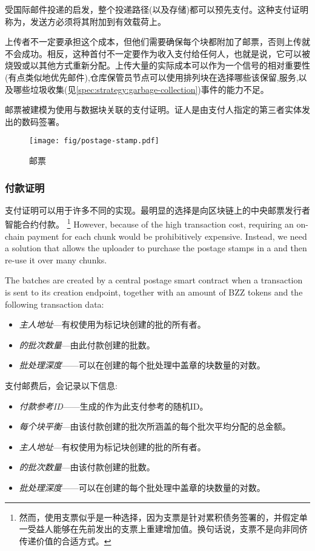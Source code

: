受国际邮件投递的启发，整个投递路径(以及存储)都可以预先支付。这种支付证明称为，发送方必须将其附加到有效载荷上。

上传者不一定要承担这个成本，但他们需要确保每个块都附加了邮票，否则上传就不会成功。相反，这种首付不一定要作为收入支付给任何人，也就是说，它可以被烧毁或以其他方式重新分配。上传大量的实际成本可以作为一个信号的相对重要性(有点类似地优先邮件),仓库保管员节点可以使用排列块在选择哪些该保留,服务,以及哪些垃圾收集(见\ref{spec:strategy:garbage-collection})事件的能力不足。

邮票被建模为使用与数据块关联的支付证明。证人是由支付人指定的第三者实体发出的数码签署。


\begin{figure}[htbp]
\centering
  \texttt{[image: fig/postage-stamp.pdf]}
\caption[邮票\statusgreen]{邮票}
\label{fig:postage-stamps}
\end{figure}

\subsubsection{付款证明}

支付证明可以用于许多不同的实现。最明显的选择是向区块链上的中央邮票发行者智能合约付款。%
%
\footnote{然而，使用支票似乎是一种选择，因为支票是针对累积债务签署的，并假定单一受益人能够在先前发出的支票上重建增加值。换句话说，支票不是向非同侪传递价值的合适方式。}
%
However, because of the high transaction cost, requiring an on-chain payment for each chunk would be prohibitively expensive. Instead, we need a solution that allows the uploader to purchase the postage stamps in a  and then re-use it over many chunks. 


The batches are created by a central postage smart contract when a transaction is sent to its creation endpoint, together with an amount of BZZ tokens and the following transaction data:

\begin{itemize}
\item \emph{主人地址}—有权使用为标记块创建的批的所有者。
\item \emph{的批次数量}—由此付款创建的批数。
\item \emph{批处理深度}——可以在创建的每个批处理中盖章的块数量的对数。
\end{itemize}

支付邮费后，会记录以下信息:

\begin{itemize}
\item \emph{付款参考ID}——生成的作为此支付参考的随机ID。
\item \emph{每个块平衡}—由该付款创建的批次所涵盖的每个批次平均分配的总金额。
\item \emph{主人地址}—有权使用为标记块创建的批的所有者。
\item \emph{的批次数量}—由该付款创建的批数。
\item \emph{批处理深度}——可以在创建的每个批处理中盖章的块数量的对数。
\end{itemize}


